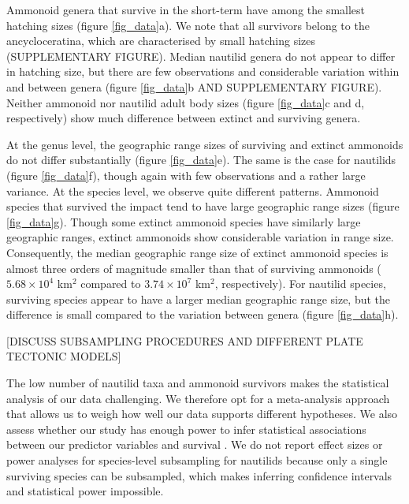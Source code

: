 \documentclass[a4paper]{article}
\begin{document}

Ammonoid genera that survive in the short-term have among the smallest hatching sizes (figure \ref{fig_data}a). 
We note that all survivors belong to the ancycloceratina, which are characterised by small hatching sizes (SUPPLEMENTARY FIGURE).
Median nautilid genera do not appear to differ in hatching size, but there are few observations and considerable variation within and between genera (figure \ref{fig_data}b AND SUPPLEMENTARY FIGURE). %
Neither ammonoid nor nautilid adult body sizes (figure \ref{fig_data}c and d, respectively) show much difference between extinct and surviving genera. 

At the genus level, the geographic range sizes of surviving and extinct ammonoids do not differ substantially (figure \ref{fig_data}e). The same is the case for nautilids (figure \ref{fig_data}f), though again with few observations and a rather large variance. At the species level, we observe quite different patterns. Ammonoid species that survived the impact tend to have large geographic range sizes (figure \ref{fig_data}g). Though some extinct ammonoid species have similarly large geographic ranges, extinct ammonoids show considerable variation in range size. Consequently, the median geographic range size of extinct ammonoid species is almost three orders of magnitude smaller than that of surviving ammonoids ($5.68\times 10^{4}$ km$^{2}$ compared to $3.74\times 10^{7}$ km$^{2}$, respectively). For nautilid species, surviving species appear to have a larger median geographic range size, but the difference is small compared to the variation between genera (figure \ref{fig_data}h).

[DISCUSS SUBSAMPLING PROCEDURES AND DIFFERENT PLATE TECTONIC MODELS]

The low number of nautilid taxa and ammonoid survivors makes the statistical analysis of our data challenging. We therefore opt for a meta-analysis approach that allows us to weigh how well our data supports different hypotheses. We also assess whether our study has enough power to infer statistical associations between our predictor variables and survival \parencite{quintanaGuideCalculatingStudyLevel2023}.
We do not report effect sizes or power analyses for species-level subsampling for nautilids because only a single surviving species can be subsampled, which makes inferring confidence intervals and statistical power impossible. 
\end{document}
